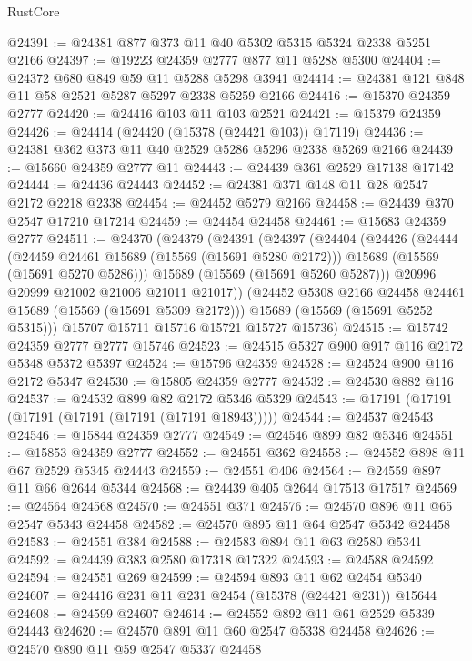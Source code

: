 \begin{lexlean}{RustCore}
\begin{coremodule}
@24391 := @24381 @877 @373 @11 @40 @5302 @5315 @5324 @2338 @5251 @2166
@24397 := @19223 @24359 @2777 @877 @11 @5288 @5300
@24404 := @24372 @680 @849 @59 @11 @5288 @5298 @3941
@24414 := @24381 @121 @848 @11 @58 @2521 @5287 @5297 @2338 @5259 @2166
@24416 := @15370 @24359 @2777
@24420 := @24416 @103 @11 @103 @2521
@24421 := @15379 @24359
@24426 := @24414 (@24420 (@15378 (@24421 @103)) @17119)
@24436 := @24381 @362 @373 @11 @40 @2529 @5286 @5296 @2338 @5269 @2166
@24439 := @15660 @24359 @2777 @11
@24443 := @24439 @361 @2529 @17138 @17142
@24444 := @24436 @24443
@24452 := @24381 @371 @148 @11 @28 @2547 @2172 @2218 @2338
@24454 := @24452 @5279 @2166
@24458 := @24439 @370 @2547 @17210 @17214
@24459 := @24454 @24458
@24461 := @15683 @24359 @2777
@24511 := @24370
    (@24379
      (@24391
        (@24397
          (@24404
            (@24426
              (@24444
                (@24459 @24461 @15689 (@15569 (@15691 @5280 @2172)))
                @15689
                (@15569 (@15691 @5270 @5286)))
              @15689
              (@15569 (@15691 @5260 @5287)))
            @20996
            @20999
            @21002
            @21006
            @21011
            @21017))
        (@24452 @5308 @2166 @24458 @24461 @15689 (@15569 (@15691 @5309 @2172)))
        @15689
        (@15569 (@15691 @5252 @5315)))
      @15707
      @15711
      @15716
      @15721
      @15727
      @15736)
@24515 := @15742 @24359 @2777 @2777 @15746
@24523 := @24515 @5327 @900 @917 @116 @2172 @5348 @5372 @5397
@24524 := @15796 @24359
@24528 := @24524 @900 @116 @2172 @5347
@24530 := @15805 @24359 @2777
@24532 := @24530 @882 @116
@24537 := @24532 @899 @82 @2172 @5346 @5329
@24543 := @17191 (@17191 (@17191 (@17191 (@17191 (@17191 @18943)))))
@24544 := @24537 @24543
@24546 := @15844 @24359 @2777
@24549 := @24546 @899 @82 @5346
@24551 := @15853 @24359 @2777
@24552 := @24551 @362
@24558 := @24552 @898 @11 @67 @2529 @5345 @24443
@24559 := @24551 @406
@24564 := @24559 @897 @11 @66 @2644 @5344
@24568 := @24439 @405 @2644 @17513 @17517
@24569 := @24564 @24568
@24570 := @24551 @371
@24576 := @24570 @896 @11 @65 @2547 @5343 @24458
@24582 := @24570 @895 @11 @64 @2547 @5342 @24458
@24583 := @24551 @384
@24588 := @24583 @894 @11 @63 @2580 @5341
@24592 := @24439 @383 @2580 @17318 @17322
@24593 := @24588 @24592
@24594 := @24551 @269
@24599 := @24594 @893 @11 @62 @2454 @5340
@24607 := @24416 @231 @11 @231 @2454 (@15378 (@24421 @231)) @15644
@24608 := @24599 @24607
@24614 := @24552 @892 @11 @61 @2529 @5339 @24443
@24620 := @24570 @891 @11 @60 @2547 @5338 @24458
@24626 := @24570 @890 @11 @59 @2547 @5337 @24458

\end{coremodule}
\end{lexlean}
